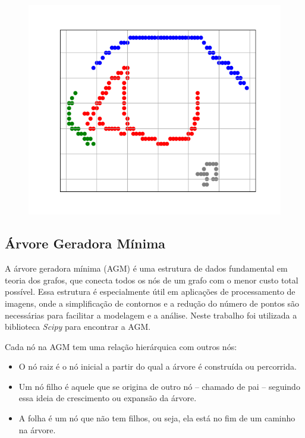 \begin{figure}[h!]
\begin{minipage}[b]{0.32\textwidth}
        \label{fig:canny-olho}
    \end{minipage}
    \begin{minipage}[b]{0.32\textwidth}
        \centering
        \includegraphics[width=1\linewidth]{fig/04_connected_components_right_eye.png}
        \label{fig:grafos-olho}
    \end{minipage}
    \label{fig:resultado-grafo}
\end{figure}

\subsection{Árvore Geradora Mínima}
\label{sec:arvore-geradora-minima}

A árvore geradora mínima (AGM) é uma estrutura de dados fundamental em teoria dos grafos, que conecta todos os nós de um grafo com o menor custo total possível. Essa estrutura é especialmente útil em aplicações de processamento de imagens, onde a simplificação de contornos e a redução do número de pontos são necessárias para facilitar a modelagem e a análise. Neste trabalho foi utilizada a biblioteca \textit{Scipy} \cite{Scipy} para encontrar a AGM.

Cada nó na AGM tem uma relação hierárquica com outros nós:
\begin{itemize}
    \item O nó raiz é o nó inicial a partir do qual a árvore é construída ou percorrida.
    \item Um nó filho é aquele que se origina de outro nó -- chamado de pai -- seguindo essa ideia de crescimento ou expansão da árvore.
    \item A folha é um nó que não tem filhos, ou seja, ela está no fim de um caminho na árvore.
\end{itemize}

